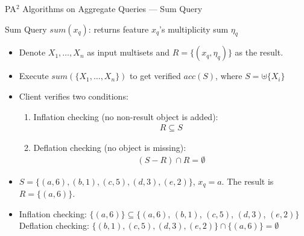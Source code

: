 \documentclass[xcolor={dvipsnames},aspectratio=169,10pt]{beamer}
\begin{document}
\begin{frame}{PA$^2$ Algorithms on Aggregate Queries --- Sum Query}
  \begin{block}{Sum Query $sum(x_q)$: returns feature $x_q$'s multiplicity sum $\eta_q$}
    \begin{itemize}
      \item Denote $X_1, \dotsc, X_n$ as input multisets and $R = \{ (x_q, \eta_q) \}$ as the result.
      \item Execute $sum(\{X_1, \dotsc, X_n\})$ to get verified $acc(S)$, where $S = \uplus \{X_i\}$
      \item Client verifies two conditions:
        \begin{enumerate}
          \item \alert{Inflation checking} (no non-result object is added):
            \begin{align*}
              R \subseteq S
            \end{align*}
          \item \alert{Deflation checking} (no object is missing):
            \begin{align*}
              (S - R) \cap R = \emptyset
            \end{align*}
        \end{enumerate}
    \end{itemize}
  \end{block}
  \begin{example}
    \begin{itemize}
      \item $S = \{(a,6), (b, 1), (c, 5), (d, 3), (e, 2)\}$, $x_q = a$. The result is $R = \{(a, 6)\}$.
      \item \alert{Inflation checking}: $\{(a, 6)\} \subseteq \{(a,6)$, $(b, 1)$, $(c, 5)$, $(d, 3)$, $(e, 2)\}$ \\
        \alert{Deflation checking}: $\{(b, 1), (c,5), (d, 3), (e, 2)\} \cap \{(a, 6)\} = \emptyset$
    \end{itemize}
  \end{example}
\end{frame}
\end{document}
